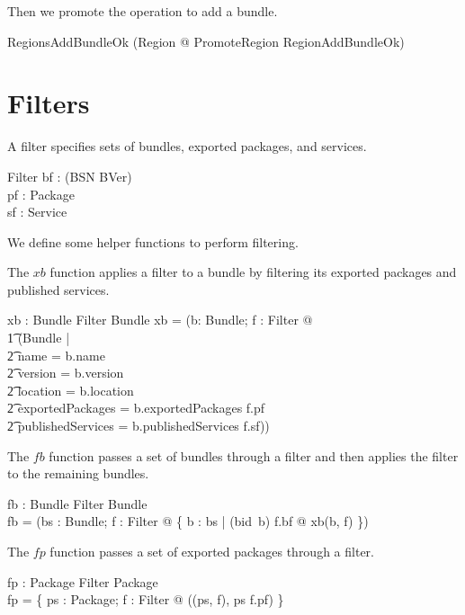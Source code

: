 \documentclass[a4paper,9pt]{article}
\begin{document}
Then we promote the operation to add a bundle.
\begin{zed}
  RegionsAddBundleOk  (\exists \Delta Region @ PromoteRegion \land RegionAddBundleOk) \\
\end{zed}

\clearpage
\section{Filters}
\label{cha:filters}

A filter specifies sets of bundles, exported packages, and services.
\begin{schema}{Filter}
  bf : \power (BSN \cross BVer) \\
  pf : \power Package \\
  sf : \power Service \\
\end{schema}

We define some helper functions to perform filtering.

The $xb$ function applies a filter to a bundle by filtering its exported packages and published services.
\begin{axdef}
  xb : Bundle \cross Filter \fun Bundle
\where
  xb = (\lambda b: Bundle; f : Filter @ \\
\t1  (\mu Bundle | \\
\t2 name = b.name \land \\
\t2 version = b.version \land \\
\t2 location = b.location \land \\
\t2 exportedPackages = b.exportedPackages \cap f.pf \land \\
\t2 publishedServices = b.publishedServices \cap f.sf))
\end{axdef}

The $fb$ function passes a set of bundles through a filter and then
applies the filter to the remaining bundles.
\begin{axdef}
  fb : \power Bundle \cross Filter \fun \power Bundle \\
\where
  fb = (\lambda bs : \power Bundle; f : Filter @ \{ b : bs | (bid~b) \in f.bf @ xb(b, f) \}) \\
\end{axdef}

The $fp$ function passes a set of exported packages through a filter.
\begin{axdef}
  fp : \power Package \cross Filter \fun \power Package \\
\where
  fp = \{ ps : \power Package; f : Filter @ ((ps, f), ps \cap f.pf) \}
\end{axdef}
\end{document}
